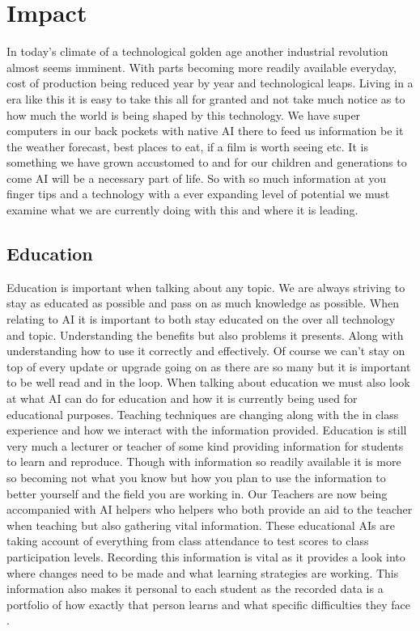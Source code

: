 \documentclass[conference]{IEEEtran}
\begin{document}
\section{Impact}
In today's climate of a technological golden age another industrial revolution almost seems imminent. With parts becoming more readily available everyday, cost of production being reduced year by year and technological leaps. Living in a era like this it is easy to take this all for granted and not take much notice as to how much the world is being shaped by this technology. We have super computers in our back pockets with native AI there to feed us information be it the weather forecast, best places to eat, if a film is worth seeing etc. It is something we have grown accustomed to and for our children and generations to come AI will be a necessary part of life. So with so much information at you finger tips and a technology with a ever expanding level of potential we must examine what we are currently doing with this and where it is leading.
\subsection{Education}
Education is important when talking about any topic. We are always striving to stay as educated as possible and pass on as much knowledge as possible. When relating to AI it is important to both stay educated on the over all technology and topic. Understanding the benefits but also problems it presents. Along with understanding how to use it correctly and effectively. Of course we can't stay on top of every update or upgrade going on as there are so many but it is important to be well read and in the loop. When talking about education we must also look at what AI can do for education and how it is currently being used for educational purposes. Teaching techniques are changing along with the in class experience and how we interact with the information provided. Education is still very much a lecturer or teacher of some kind providing information for students to learn and reproduce. Though with information so readily available it is more so becoming not what you know but how you plan to use the information to better yourself and the field you are working in. Our Teachers are now being accompanied with AI helpers who helpers who both provide an aid to the teacher when teaching but also gathering vital information. These educational AIs are taking account of everything from class attendance to test scores to class participation levels. Recording this information is vital as it provides a look into where changes need to be made and what learning strategies are working. This information also makes it personal to each student as the recorded data is a portfolio of how exactly that person learns and what specific difficulties they face \cite{Education}. 
\end{document}
